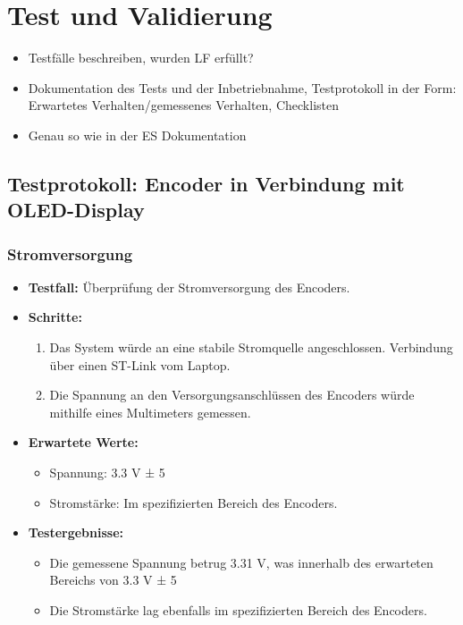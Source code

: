 \newpage
\section{Test und Validierung}
\begin{itemize}
	\item Testfälle beschreiben, wurden LF erfüllt?
	\item Dokumentation des Tests und der Inbetriebnahme, Testprotokoll in der Form: Erwartetes Verhalten/gemessenes Verhalten, Checklisten
	\item Genau so wie in der ES Dokumentation
\end{itemize}






\subsection{Testprotokoll: Encoder in Verbindung mit OLED-Display}

\subsubsection{Stromversorgung}
\begin{itemize}
\item \textbf{Testfall:} Überprüfung der Stromversorgung des Encoders.
\item \textbf{Schritte:}
\begin{enumerate}
\item Das System würde an eine stabile Stromquelle angeschlossen. Verbindung über einen ST-Link vom Laptop.
\item Die Spannung an den Versorgungsanschlüssen des Encoders würde mithilfe eines Multimeters gemessen.
\end{enumerate}
\item \textbf{Erwartete Werte:}
\begin{itemize}
\item Spannung: 3.3 V ± 5%
\item Stromstärke: Im spezifizierten Bereich des Encoders.
\end{itemize}
\item \textbf{Testergebnisse:}
\begin{itemize}
\item Die gemessene Spannung betrug 3.31 V, was innerhalb des erwarteten Bereichs von 3.3 V ± 5%
\item Die Stromstärke lag ebenfalls im spezifizierten Bereich des Encoders.
\end{itemize}
\end{itemize}

